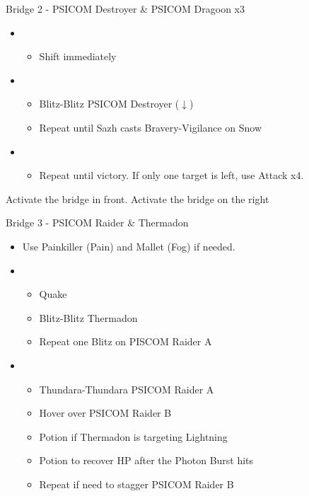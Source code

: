 \begin{paracol}{2}
	\begin{battle}{Bridge 2 - PSICOM Destroyer \& PSICOM Dragoon x3}
		\begin{itemize}
			\item \first
			      \begin{itemize}
				      \item Shift immediately
			      \end{itemize}
			\item \third
			      \begin{itemize}
				      \item Blitz-Blitz PSICOM Destroyer ($\downarrow$)
				      \item Repeat until Sazh casts Bravery-Vigilance on Snow
			      \end{itemize}
			\item \fifth
			      \begin{itemize}
				      \item Repeat until victory. If only one target is left, use Attack x4.
			      \end{itemize}
		\end{itemize}
		  
	\end{battle}
	Activate the bridge in front.  Activate the bridge on the right
	\begin{battle}{Bridge 3 - PSICOM Raider \& Thermadon}
		\begin{itemize}
			\item Use Painkiller (Pain) and Mallet (Fog) if needed.
			\item \first
			      \begin{itemize}
				      \item Quake
				      \item Blitz-Blitz Thermadon
				      \item Repeat one Blitz on PISCOM Raider A
			      \end{itemize}
			\item \second
			      \begin{itemize}
				      \item Thundara-Thundara PSICOM Raider A
				      \item Hover over PSICOM Raider B
				      \item Potion if Thermadon is targeting Lightning
				      \item Potion to recover HP after the Photon Burst hits
				      \item Repeat if need to stagger PSICOM Raider B

\end{itemize}
\end{itemize}
\end{battle}
\end{paracol}
